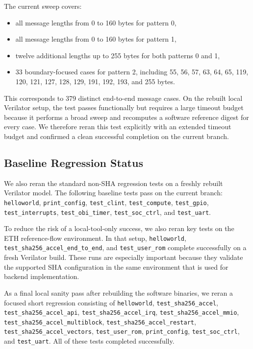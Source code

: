 \documentclass[11pt,a4paper]{article}
\begin{document}
The current sweep covers:
\begin{itemize}
  \item all message lengths from 0 to 160 bytes for pattern 0,
  \item all message lengths from 0 to 160 bytes for pattern 1,
  \item twelve additional lengths up to 255 bytes for both patterns 0 and 1,
  \item 33 boundary-focused cases for pattern 2, including 55, 56, 57, 63, 64,
  65, 119, 120, 121, 127, 128, 129, 191, 192, 193, and 255 bytes.
\end{itemize}

This corresponds to 379 distinct end-to-end message cases. On the rebuilt local
Verilator setup, the test passes functionally but requires a large timeout
budget because it performs a broad sweep and recomputes a software reference
digest for every case. We therefore reran this test explicitly with an
extended timeout budget and confirmed a clean successful completion on the
current branch.

\subsection{Baseline Regression Status}
We also reran the standard non-SHA regression tests on a freshly rebuilt
Verilator model. The following baseline tests pass on the current branch:
\texttt{helloworld}, \texttt{print\_config}, \texttt{test\_clint},
\texttt{test\_compute}, \texttt{test\_gpio}, \texttt{test\_interrupts},
\texttt{test\_obi\_timer}, \texttt{test\_soc\_ctrl}, and \texttt{test\_uart}.

To reduce the risk of a local-tool-only success, we also reran key tests on the
ETH reference-flow environment. In that setup, \texttt{helloworld},
\texttt{test\_sha256\_accel\_end\_to\_end}, and \texttt{test\_user\_rom}
complete successfully on a fresh Verilator build. These runs are especially
important because they validate the supported SHA configuration in the same
environment that is used for backend implementation.

As a final local sanity pass after rebuilding the software binaries, we reran a
focused short regression consisting of \texttt{helloworld},
\texttt{test\_sha256\_accel}, \texttt{test\_sha256\_accel\_api},
\texttt{test\_sha256\_accel\_irq}, \texttt{test\_sha256\_accel\_mmio},
\texttt{test\_sha256\_accel\_multiblock},
\texttt{test\_sha256\_accel\_restart},
\texttt{test\_sha256\_accel\_vectors}, \texttt{test\_user\_rom},
\texttt{print\_config}, \texttt{test\_soc\_ctrl}, and \texttt{test\_uart}. All
of these tests completed successfully.
\end{document}
